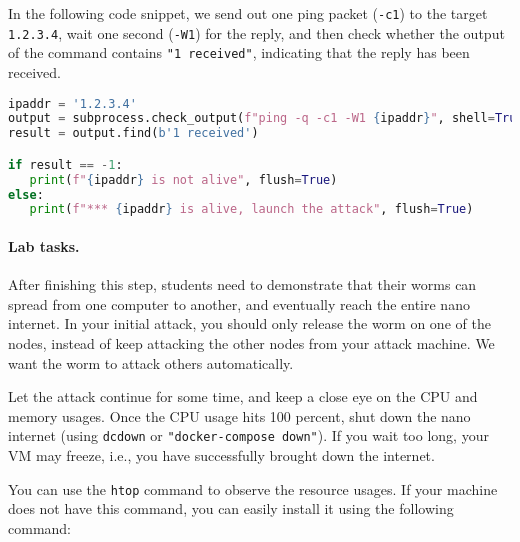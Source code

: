 In the following code snippet, we send out one ping packet (\texttt{-c1}) 
to the target \texttt{1.2.3.4}, wait one second (\texttt{-W1})  
for the reply, and then check whether the
output of the command contains \texttt{"1 received"}, indicating
that the reply has been received. 



\begin{lstlisting}[language=Python]
ipaddr = '1.2.3.4'
output = subprocess.check_output(f"ping -q -c1 -W1 {ipaddr}", shell=True)
result = output.find(b'1 received')

if result == -1:
   print(f"{ipaddr} is not alive", flush=True)
else:
   print(f"*** {ipaddr} is alive, launch the attack", flush=True)
\end{lstlisting}
 
 



\paragraph{Lab tasks.}
After finishing this step, students need to demonstrate that their worms can 
spread from one computer to another, and eventually reach the entire 
nano internet. In your initial attack, you should only release the worm 
on one of the nodes, instead of keep
attacking the other nodes from your attack machine. We want the 
worm to attack others automatically. 

Let the attack continue for some time, and keep a close eye 
on the CPU and memory usages. Once the CPU usage hits 100
percent, shut down the nano internet (using \texttt{dcdown} or
\texttt{"docker-compose down"}). If you wait too long, your VM
may freeze, i.e., you have successfully brought down the internet. 

You can use the \texttt{htop} command to observe the resource usages. If
your machine does not have this command, you can easily install it 
using the following command:

